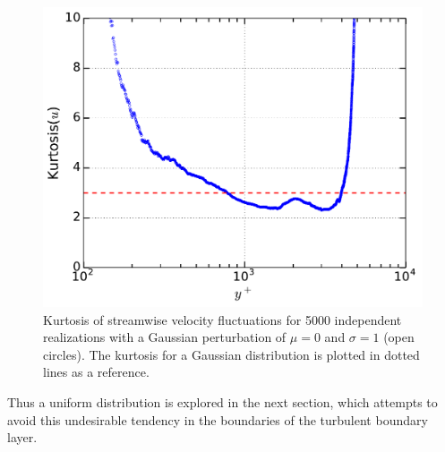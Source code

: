 \documentclass[aps,reprint,amsmath,amssymb,pra]{revtex4-1}%
\begin{document}
\begin{figure}[tb] 
\includegraphics[scale=0.46]{figures/kurtosis_5000_assembles_gauss100}
\caption{\label{fig:kurtgaus100} Kurtosis of streamwise velocity fluctuations for 5000 independent realizations with a Gaussian perturbation of $\mu=0$ and $\sigma=1$ (open circles). The kurtosis for a Gaussian distribution is plotted in dotted lines as a reference.}
\end{figure}
Thus a uniform distribution is explored in the next section, which attempts to avoid this undesirable tendency in the boundaries of the turbulent boundary layer.
\end{document}
